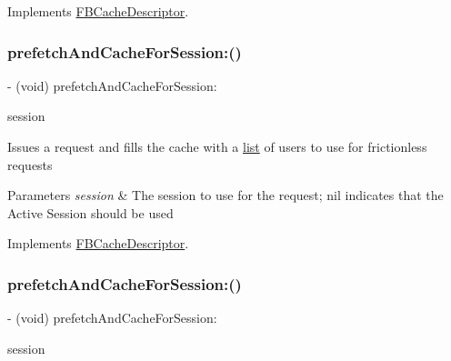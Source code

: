 Implements \hyperlink{interfaceFBCacheDescriptor_a1d3bbb38753d402a6f08e9402904a8d6}{F\+B\+Cache\+Descriptor}.

\mbox{\label{interfaceFBFrictionlessRecipientCache_a4f218828f2b6a8bb5a8e0044e98689dc}} 
\subsubsection{\texorpdfstring{prefetch\+And\+Cache\+For\+Session\+:()}{prefetchAndCacheForSession:()}\hspace{0.1cm}{\footnotesize\ttfamily [2/5]}}
{\footnotesize\ttfamily -\/ (void) prefetch\+And\+Cache\+For\+Session\+: \begin{DoxyParamCaption}\item[{(\hyperlink{interfaceFBSession}{F\+B\+Session} $\ast$)}]{session }\end{DoxyParamCaption}}

Issues a request and fills the cache with a \hyperlink{protocollist-p}{list} of users to use for frictionless requests


\begin{DoxyParams}{Parameters}
{\em session} & The session to use for the request; nil indicates that the Active Session should be used \\
\hline
\end{DoxyParams}


Implements \hyperlink{interfaceFBCacheDescriptor_a1d3bbb38753d402a6f08e9402904a8d6}{F\+B\+Cache\+Descriptor}.

\mbox{\label{interfaceFBFrictionlessRecipientCache_a4f218828f2b6a8bb5a8e0044e98689dc}} 
\subsubsection{\texorpdfstring{prefetch\+And\+Cache\+For\+Session\+:()}{prefetchAndCacheForSession:()}\hspace{0.1cm}{\footnotesize\ttfamily [3/5]}}
{\footnotesize\ttfamily -\/ (void) prefetch\+And\+Cache\+For\+Session\+: \begin{DoxyParamCaption}\item[{(\hyperlink{interfaceFBSession}{F\+B\+Session} $\ast$)}]{session }\end{DoxyParamCaption}}

